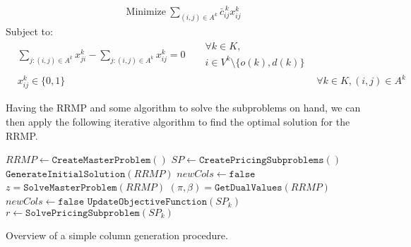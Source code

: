 \documentclass{article}
\begin{document}
\noindent
\begin{minipage}{\linewidth}
   \begin{align}
      \mathrm{Minimize~}\sum_{(i,j) \in A^k} \bar{c}^{\,k}_{ij} x^k_{ij} \label{model:pricing:obj}
   \end{align}
   \qquad Subject to:
   \begin{align}
      & \sum_{j : (i,j) \in A^k} x^k_{ji} - \sum_{j : (i,j) \in A^k} x^k_{ij} = 0 &
      \begin{split}
         & \forall k \in K, \\
         & i \in V^k \setminus \{o(k), d(k)\}
      \end{split} \label{model:pricing:flow-conserv}\\[4pt]
      & x^k_{ij} \in \{0, 1\} & & \forall k \in K, (i,j) \in A^k \label{model:pricing:domain}
   \end{align}
\end{minipage}

\vspace{12pt}

Having the RRMP and some algorithm to solve the subproblems on hand, we can then apply the following iterative algorithm to find the optimal solution for the RRMP.

\begin{algorithm}
   $\mathit{RRMP} \gets \mathtt{CreateMasterProblem()}$\;
   $\mathit{SP} \gets \mathtt{CreatePricingSubproblems}()$\;
   $\mathtt{GenerateInitialSolution}(\mathit{RRMP})$\;
   $\mathit{newCols} \gets \mathtt{false}$\;
    {
      $z = \mathtt{SolveMasterProblem}(\mathit{RRMP})$\;
      $(\pi, \beta) = \mathtt{GetDualValues}(\mathit{RRMP})$\;
      $\mathit{newCols} \gets \mathtt{false}$\;
       {
         $\mathtt{UpdateObjectiveFunction}(\mathit{SP}_k)$\;
         $r \gets \mathtt{SolvePricingSubproblem}(\mathit{SP}_k)$\;
      }
   }
   \caption{Overview of a simple column generation procedure.}
\end{algorithm}
\end{document}
